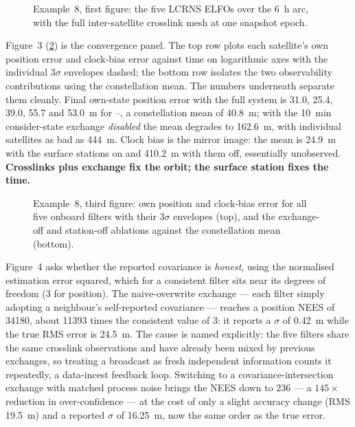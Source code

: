 \begin{figure}[htbp]
  \centering
  \caption{Example~8, first figure: the five LCRNS ELFOs over the \SI{6}{\hour}
           arc, with the full inter-satellite crosslink mesh at one snapshot
           epoch.}
  \label{fig:tut-ex8-mesh}
\end{figure}

Figure~3 (\cref{fig:tut-ex8-conv}) is the convergence panel. The top row plots
each satellite's own position error and clock-bias error against time on
logarithmic axes with the individual $3\sigma$ envelopes dashed; the bottom row
isolates the two observability contributions using the constellation mean. The
numbers underneath separate them cleanly. Final own-state position error with the
full system is \SI{31.0}{}, \SI{25.4}{}, \SI{39.0}{}, \SI{55.7}{} and
\SI{53.0}{\meter} for --, a constellation mean of
\SI{40.8}{\meter}; with the \SI{10}{\minute} consider-state exchange
\emph{disabled} the mean degrades to \SI{162.6}{\meter}, with individual
satellites as bad as \SI{444}{\meter}. Clock bias is the mirror image: the mean
is \SI{24.9}{\meter} with the surface stations on and \SI{410.2}{\meter} with
them off, essentially unobserved. \textbf{Crosslinks plus exchange fix the
orbit; the surface station fixes the time.}

\begin{figure}[htbp]
  \centering
  \caption{Example~8, third figure: own position and clock-bias error for all
           five onboard filters with their $3\sigma$ envelopes (top), and the
           exchange-off and station-off ablations against the constellation mean
           (bottom).}
  \label{fig:tut-ex8-conv}
\end{figure}

Figure~4 asks whether the reported covariance is \emph{honest}, using the
normalised estimation error squared, which for a consistent filter sits near its
degrees of freedom (3 for position). The naive-overwrite exchange --- each
filter simply adopting a neighbour's self-reported covariance --- reaches a
position NEES of \num{34180}, about \num{11393} times the consistent value of 3:
it reports a $\sigma$ of \SI{0.42}{\meter} while the true RMS error is
\SI{24.5}{\meter}. The cause is named explicitly: the five filters share the same
crosslink observations and have already been mixed by previous exchanges, so
treating a broadcast as fresh independent information counts it repeatedly, a
data-incest feedback loop. Switching to a covariance-intersection exchange with
matched process noise brings the NEES down to \num{236} --- a $145\times$
reduction in over-confidence --- at the cost of only a slight accuracy change
(RMS \SI{19.5}{\meter}) and a reported $\sigma$ of \SI{16.25}{\meter}, now the
same order as the true error.

